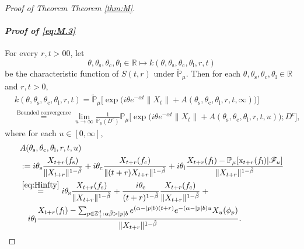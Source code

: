 \documentclass[12pt,a4paper]{amsart}
\theoremstyle{plain}
\theoremstyle{definition}
\numberwithin{equation}{section}
\begin{document}
\begin{proof}[Proof of Theorem Theorem \ref{thm:M}]
\paragraph{\it Proof of \eqref{eq:M.3}}
For every $r,t >0 0$, let 
\[
\theta,\theta_\mathrm s,\theta_\mathrm c,\theta_\mathrm l\in \mathbb R \mapsto k(\theta,\theta_\mathrm s,\theta_\mathrm c,\theta_\mathrm l,r,t)
\]
be the characteristic function of  $S(t,r)$ under $\widetilde{\mathbb P}_{\mu}$.
Then for each $\theta,\theta_\mathrm s,\theta_\mathrm c,\theta_\mathrm l\in \mathbb R$ and $r,t> 0$,
\begin{align}
&k(\theta,\theta_\mathrm s,\theta_\mathrm c,\theta_\mathrm l,r,t)
=\widetilde{\mathbb P}_{\mu}\big[\exp\big( i\theta e^{-\alpha t}\|X_t\|+A(\theta_\mathrm s,\theta_\mathrm c,\theta_\mathrm l,r,t,\infty)\big)\big]\\
&\label{eq:M.5}\overset{\text{Bounded convergence}}=\lim_{u\rightarrow \infty}\frac{1}{\mathbb P_{\mu}(D^c)}\mathbb P_{\mu}\big[\exp\big( i\theta e^{-\alpha t}\|X_t\|+A(\theta_\mathrm s,\theta_\mathrm c,\theta_\mathrm l,r,t,u)\big);D^c\big],
\end{align}
where for each $u\in [0,\infty]$,
\begin{align}
&A(\theta_\mathrm s,\theta_\mathrm c,\theta_\mathrm l,r,t,u)
\\&:=i\theta_\mathrm s \frac{X_{t+r}(f_\mathrm s)}{\|X_{t+r}\|^{1-\tilde{\beta}}} + i\theta_\mathrm c \frac{X_{t+r}(f_\mathrm c)}{\|(t+r)X_{t+r}\|^{1-\tilde{\beta}}} + i\theta_\mathrm l  \frac{ X_{t+r}(f_\mathrm l)- \mathbb P_\mu[\mathrm x_{t+r}(f_\mathrm l)|\mathscr F_u]}{\|X_{t+r}\|^{1-\tilde{\beta}}}
\\&\label{eq:M.6}\begin{multlined}
\overset{\eqref{eq:Hinfty}}=i\theta_\mathrm s \frac{X_{t+r}(f_\mathrm s)}{\|X_{t+r}\|^{1-\tilde{\beta}}} + \frac{i\theta_\mathrm c}{(t+r)^{1-\tilde{\beta}}} \frac{X_{t+r}(f_\mathrm c)}{\|X_{t+r}\|^{1-\tilde{\beta}}} + {}
\\ i\theta_\mathrm l  \frac{ X_{t+r}(f_\mathrm l) - \sum_{p\in \mathbb Z_+^d:\alpha\tilde{\beta}>|p|b} e^{(\alpha - |p|b)(t+r)} e^{-(\alpha - |p|b)u}X_u(\phi_p) }{\|X_{t+r}\|^{1-\tilde{\beta}}}.
\end{multlined}

\end{align}
\end{proof}
\end{document}
